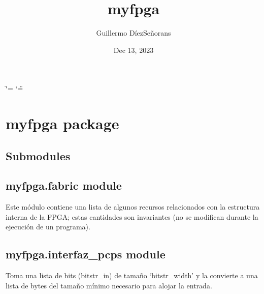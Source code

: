 \documentclass[letterpaper,10pt,english]{sphinxmanual}
\title{myfpga}
\date{Dec 13, 2023}
\author{Guillermo Díez\sphinxhyphen{}Señorans}
\begin{document}
\ifdefined\shorthandoff
  \ifnum\catcode`\=\string=\active\shorthandoff{=}\fi
  \ifnum\catcode`\"=\active{}\fi
\fi

\pagestyle{empty}
\sphinxmaketitle
\pagestyle{plain}
\sphinxtableofcontents
\pagestyle{normal}
\label{\detokenize{index::doc}}


\sphinxstepscope


\chapter{myfpga package}
\label{\detokenize{myfpga:myfpga-package}}\label{\detokenize{myfpga::doc}}

\section{Submodules}
\label{\detokenize{myfpga:submodules}}

\section{myfpga.fabric module}
\label{\detokenize{myfpga:module-myfpga.fabric}}\label{\detokenize{myfpga:myfpga-fabric-module}}
\sphinxAtStartPar
Este módulo contiene una lista de algunos recursos relacionados con la 
estructura interna de la FPGA; estas cantidades son invariantes (no se
modifican durante la ejecución de un programa).


\section{myfpga.interfaz\_pcps module}
\label{\detokenize{myfpga:module-myfpga.interfaz_pcps}}\label{\detokenize{myfpga:myfpga-interfaz-pcps-module}}

\begin{fulllineitems}
\label{\detokenize{myfpga:myfpga.interfaz_pcps.bitstr_to_bytestr}}
\pysigstartsignatures
{}
\pysigstopsignatures
\sphinxAtStartPar
Toma una lista de bits (bitstr\_in) de tamaño ‘bitstr\_width’
y la convierte a una lista de bytes del tamaño mínimo
necesario para alojar la entrada.

\end{fulllineitems}
\end{document}
